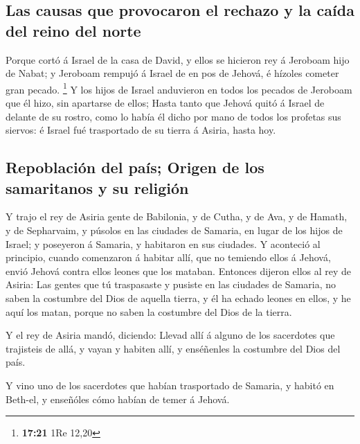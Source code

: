 \hypertarget{las-causas-que-provocaron-el-rechazo-y-la-cauxedda-del-reino-del-norte}{%
\subsection{Las causas que provocaron el rechazo y la caída del reino
del
norte}\label{las-causas-que-provocaron-el-rechazo-y-la-cauxedda-del-reino-del-norte}}

 Porque cortó á Israel de la casa de David, y ellos se
hicieron rey á Jeroboam hijo de Nabat; y Jeroboam rempujó á Israel de en
pos de Jehová, é hízoles cometer gran pecado. \footnote{\textbf{17:21}
  1Re 12,20}  Y los hijos de Israel anduvieron en todos los
pecados de Jeroboam que él hizo, sin apartarse de ellos; 
Hasta tanto que Jehová quitó á Israel de delante de su rostro, como lo
había él dicho por mano de todos los profetas sus siervos: é Israel fué
trasportado de su tierra á Asiria, hasta hoy.

\hypertarget{repoblaciuxf3n-del-pauxeds-origen-de-los-samaritanos-y-su-religiuxf3n}{%
\subsection{Repoblación del país; Origen de los samaritanos y su
religión}\label{repoblaciuxf3n-del-pauxeds-origen-de-los-samaritanos-y-su-religiuxf3n}}

 Y trajo el rey de Asiria gente de Babilonia, y de Cutha, y
de Ava, y de Hamath, y de Sepharvaim, y púsolos en las ciudades de
Samaria, en lugar de los hijos de Israel; y poseyeron á Samaria, y
habitaron en sus ciudades.  Y aconteció al principio,
cuando comenzaron á habitar allí, que no temiendo ellos á Jehová, envió
Jehová contra ellos leones que los mataban.  Entonces
dijeron ellos al rey de Asiria: Las gentes que tú traspasaste y pusiste
en las ciudades de Samaria, no saben la costumbre del Dios de aquella
tierra, y él ha echado leones en ellos, y he aquí los matan, porque no
saben la costumbre del Dios de la tierra.

 Y el rey de Asiria mandó, diciendo: Llevad allí á alguno
de los sacerdotes que trajisteis de allá, y vayan y habiten allí, y
enséñenles la costumbre del Dios del país.

 Y vino uno de los sacerdotes que habían trasportado de
Samaria, y habitó en Beth-el, y enseñóles cómo habían de temer á Jehová.

